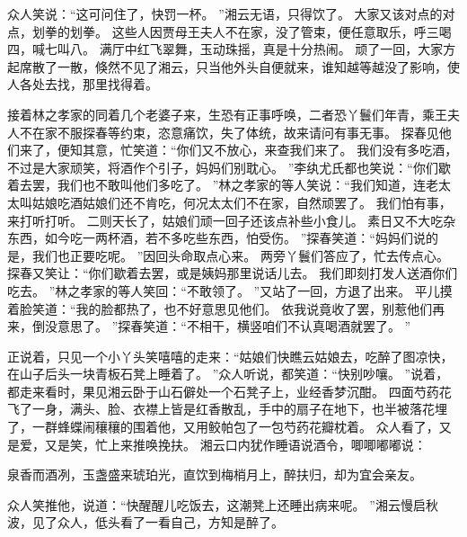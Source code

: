 众人笑说：“这可问住了，快罚一杯。
”湘云无语，只得饮了。
大家又该对点的对点，划拳的划拳。
这些人因贾母王夫人不在家，没了管束，便任意取乐，呼三喝四，喊七叫八。
满厅中红飞翠舞，玉动珠摇，真是十分热闹。
顽了一回，大家方起席散了一散，倏然不见了湘云，只当他外头自便就来，谁知越等越没了影响，使人各处去找，那里找得着。
\par
接着林之孝家的同着几个老婆子来，生恐有正事呼唤，二者恐丫鬟们年青，乘王夫人不在家不服探春等约束，恣意痛饮，失了体统，故来请问有事无事。
探春见他们来了，便知其意，忙笑道：“你们又不放心，来查我们来了。
我们没有多吃酒，不过是大家顽笑，将酒作个引子，妈妈们别耽心。
”李纨尤氏都也笑说：“你们歇着去罢，我们也不敢叫他们多吃了。
”林之孝家的等人笑说：“我们知道，连老太太叫姑娘吃酒姑娘们还不肯吃，何况太太们不在家，自然顽罢了。
我们怕有事，来打听打听。
二则天长了，姑娘们顽一回子还该点补些小食儿。
素日又不大吃杂东西，如今吃一两杯酒，若不多吃些东西，怕受伤。
”探春笑道：“妈妈们说的是，我们也正要吃呢。
”因回头命取点心来。
两旁丫鬟们答应了，忙去传点心。
探春又笑让：“你们歇着去罢，或是姨妈那里说话儿去。
我们即刻打发人送酒你们吃去。
”林之孝家的等人笑回：“不敢领了。
”又站了一回，方退了出来。
平儿摸着脸笑道：“我的脸都热了，也不好意思见他们。
依我说竟收了罢，别惹他们再来，倒没意思了。
”探春笑道：“不相干，横竖咱们不认真喝酒就罢了。
”\par
正说着，只见一个小丫头笑嘻嘻的走来：“姑娘们快瞧云姑娘去，吃醉了图凉快，在山子后头一块青板石凳上睡着了。
”众人听说，都笑道：“快别吵嚷。
”说着，都走来看时，果见湘云卧于山石僻处一个石凳子上，业经香梦沉酣。
四面芍药花飞了一身，满头、脸、衣襟上皆是红香散乱，手中的扇子在地下，也半被落花埋了，一群蜂蝶闹穰穰的围着他，又用鲛帕包了一包芍药花瓣枕着。
众人看了，又是爱，又是笑，忙上来推唤挽扶。
湘云口内犹作睡语说酒令，唧唧嘟嘟说：\par
\hop
泉香而酒冽，玉盏盛来琥珀光，直饮到梅梢月上，醉扶归，却为宜会亲友。
\par
{}\par
\hop
{}
众人笑推他，说道：“快醒醒儿吃饭去，这潮凳上还睡出病来呢。
”湘云慢启秋波，见了众人，低头看了一看自己，方知是醉了。
